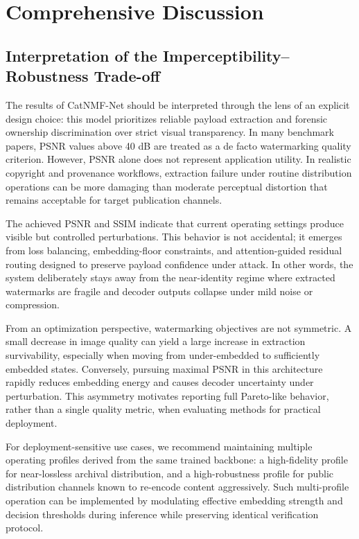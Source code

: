\documentclass[journal]{IEEEtran}
\begin{document}
\section{Comprehensive Discussion}

\subsection{Interpretation of the Imperceptibility--Robustness Trade-off}

The results of CatNMF-Net should be interpreted through the lens of an explicit
design choice: this model prioritizes reliable payload extraction and forensic
ownership discrimination over strict visual transparency. In many benchmark
papers, PSNR values above 40 dB are treated as a de facto watermarking quality
criterion. However, PSNR alone does not represent application utility. In
realistic copyright and provenance workflows, extraction failure under routine
distribution operations can be more damaging than moderate perceptual distortion
that remains acceptable for target publication channels.

The achieved PSNR and SSIM indicate that current operating settings produce
visible but controlled perturbations. This behavior is not accidental; it
emerges from loss balancing, embedding-floor constraints, and attention-guided
residual routing designed to preserve payload confidence under attack. In other
words, the system deliberately stays away from the near-identity regime where
extracted watermarks are fragile and decoder outputs collapse under mild noise
or compression.

From an optimization perspective, watermarking objectives are not symmetric.
A small decrease in image quality can yield a large increase in extraction
survivability, especially when moving from under-embedded to sufficiently
embedded states. Conversely, pursuing maximal PSNR in this architecture rapidly
reduces embedding energy and causes decoder uncertainty under perturbation.
This asymmetry motivates reporting full Pareto-like behavior, rather than a
single quality metric, when evaluating methods for practical deployment.

For deployment-sensitive use cases, we recommend maintaining multiple operating
profiles derived from the same trained backbone: a high-fidelity profile
for near-lossless archival distribution, and a high-robustness profile
for public distribution channels known to re-encode content aggressively. Such
multi-profile operation can be implemented by modulating effective embedding
strength and decision thresholds during inference while preserving identical
verification protocol.
\end{document}
